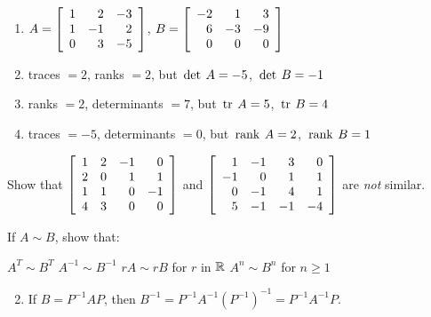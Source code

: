 \begin{multicols}{2}
\begin{ex}
\begin{enumerate}[label={\alph*.}]
\item $A = 
\left[ \begin{array}{rrr}
1 & 2 & -3 \\
1 & -1 & 2 \\
0 & 3 & -5
\end{array} \right]$, $B =
\left[ \begin{array}{rrr}
-2 & 1 & 3 \\
 6 & -3 & -9 \\
 0 & 0 & 0
\end{array} \right]$

\end{enumerate}
\begin{sol}
\begin{enumerate}[label={\alph*.}]
\setcounter{enumi}{1}
\item  traces $= 2$, ranks $= 2$, but $\thinspace\operatorname{det\medspace} A = -5$, $\thinspace\operatorname{det\medspace} B = -1$

\setcounter{enumi}{3}
\item  ranks $= 2$, determinants $= 7$, but $\thinspace\operatorname{tr\medspace} A = 5$, $\thinspace\operatorname{tr\medspace} B = 4$

\setcounter{enumi}{5}
\item  traces $= -5$, determinants $= 0$, but $\thinspace\operatorname{rank\medspace} A = 2$, $\thinspace\operatorname{rank\medspace} B = 1$

\end{enumerate}
\end{sol}
\end{ex}

\begin{ex}
Show that $\left[ \begin{array}{rrrr}
1 & 2 & -1 &  0 \\
2 & 0 &  1 &  1 \\
1 & 1 &  0 & -1 \\
4 & 3 & 0 & 0
\end{array} \right]$ and $
\left[ \begin{array}{rrrr}
  1 & -1 &  3 &  0 \\
 -1 &  0 &  1 &  1 \\
  0 & -1 &  4 &  1 \\
  5 & -1 & -1 & -4
\end{array} \right]$ are \textit{not} similar.
\end{ex}

\begin{ex}
If $A \sim B$, show that:

\begin{exenumerate}
\exitem $A^{T} \sim B^{T}$
\exitem $A^{-1} \sim B^{-1}$
\exitem $rA \sim rB$ for $r$ in $\mathbb{R}$
\exitem $A^{n} \sim B^{n}$ for $n \geq 1$
\end{exenumerate}
\begin{sol}
\begin{enumerate}[label={\alph*.}]
\setcounter{enumi}{1}
\item  If $B = P^{-1}AP$, then $B^{-1} = P^{-1}A^{-1}(P^{-1})^{-1} = P^{-1}A^{-1}P$.


\end{enumerate}
\end{sol}
\end{ex}
\end{multicols}

